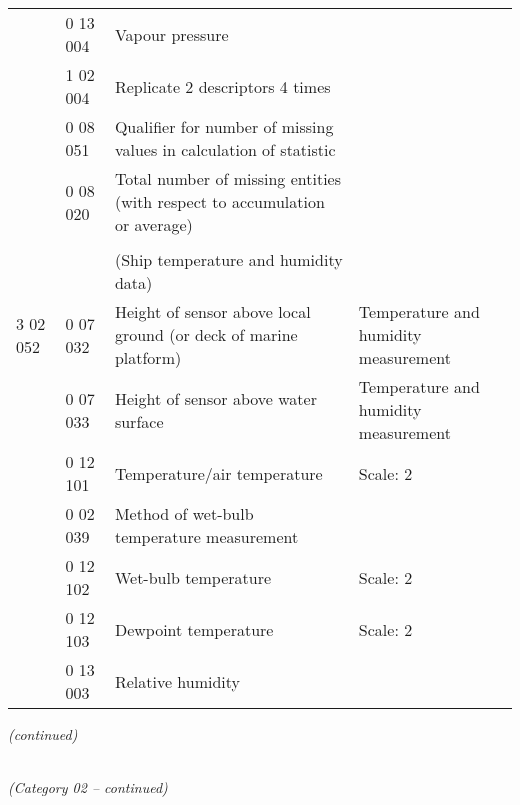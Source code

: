 \begin{longtable}[]{@{}llll@{}}
& 0 13 004 & Vapour pressure &\tabularnewline
& 1 02 004 & Replicate 2 descriptors 4 times &\tabularnewline
& 0 08 051 & Qualifier for number of missing values in calculation of statistic &\tabularnewline
& 0 08 020 & Total number of missing entities (with respect to accumulation or average) &\tabularnewline
& & &\tabularnewline
& & (Ship temperature and humidity data) &\tabularnewline
3 02 052 & 0 07 032 & Height of sensor above local ground (or deck of marine platform) & Temperature and humidity measurement\tabularnewline
& 0 07 033 & Height of sensor above water surface & Temperature and humidity measurement\tabularnewline
& 0 12 101 & Temperature/air temperature & Scale: 2\tabularnewline
& 0 02 039 & Method of wet-bulb temperature measurement &\tabularnewline
& 0 12 102 & Wet-bulb temperature & Scale: 2\tabularnewline
& 0 12 103 & Dewpoint temperature & Scale: 2\tabularnewline
& 0 13 003 & Relative humidity &\tabularnewline
\bottomrule
\end{longtable}

\emph{(continued)}

\emph{\\
(Category 02 -- continued)}

